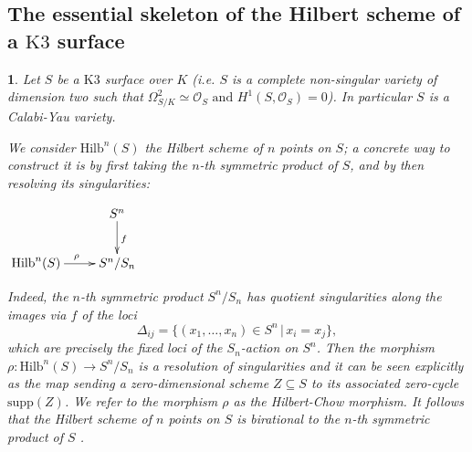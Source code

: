 \documentclass{amsart}%
\numberwithin{equation}{subsection}
\theoremstyle{plain2}
\theoremstyle{definition2}
\theoremstyle{stepstyle}
\theoremstyle{point}
\theoremstyle{subpoint}
\newtheorem{subpoint}[equation]{}%
\newcommand{\spa}[1]{\begin{subpoint}#1\end{subpoint}}           %
\newcommand{\caO}{\ensuremath{\mathcal{O}}}
\newcommand{\Hilb}{\ensuremath{\mathrm{Hilb}}}
\begin{document}
\subsection{The essential skeleton of the Hilbert scheme of a $\text{K3}$ surface} \label{sect essential sk Hilb}

\spa{Let $S$ be a $\text{K}3$ surface over $K$ (i.e. $S$ is a complete non-singular variety of dimension two such that $\Omega_{S/K}^2 \simeq \caO_S \text{ and } H^1(S,\caO_S) = 0$). In particular $S$ is a Calabi-Yau variety.

We consider $\Hilb^n(S)$ the Hilbert scheme of $n$ points on $S$; a concrete way to construct it is by first taking the $n$-th symmetric product of $S$, and by then resolving its singularities:
\begin{center}
$ \xymatrix{
& S^n \ar[d]^{f} \\
\Hilb^n(S) \ar[r]^{\rho} & S^n/S_n\\
}$
\end{center} Indeed, the $n$-th symmetric product $S^n/S_n$ has quotient singularities along the images via $f$ of the loci $$\Delta_{ij}= \{(x_1,\ldots,x_n) \in S^n \,|\, x_i=x_j\},$$ which are precisely the fixed loci of the $S_n$-action on $S^n$. Then the morphism $\rho: \Hilb^n(S) \rightarrow S^n/S_n$ is a resolution of singularities and it can be seen explicitly as the map sending a zero-dimensional scheme $Z \subseteq S$ to its associated zero-cycle $\text{supp}(Z)$. We refer to the morphism $\rho$ as the Hilbert-Chow morphism. It follows that the Hilbert scheme of $n$ points on $S$ is birational to the $n$-th symmetric product of $S$ \cite{Fogarty}. 
}
\end{document}
